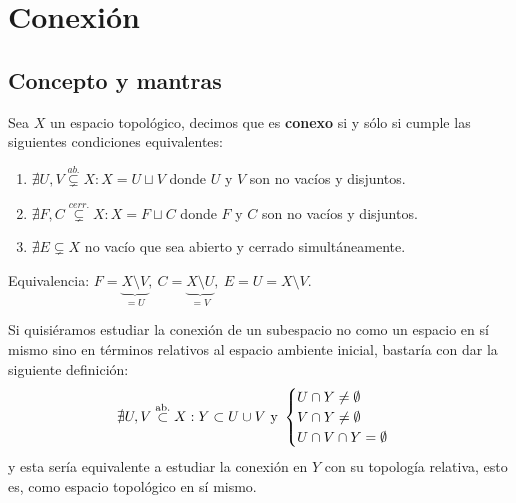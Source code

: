 \chapter{Conexión}%
\label{cha:conexion}
\section{Concepto y mantras}%
\label{sec:concepto_y_mantras_conx}
\begin{defi}[Conexión]
Sea $X$ un espacio topológico, decimos que es \textbf{conexo} si y sólo si cumple las siguientes condiciones equivalentes:
\begin{enumerate}
    \item $\nexists U,V \stackrel{ab.}{\subsetneq} X: X= U \sqcup V$ donde $U$ y $V$ son no vacíos y disjuntos.
    \item $\nexists F,C \stackrel{cerr.}{\subsetneq} X: X= F \sqcup C$ donde $F$ y $C$ son no vacíos y disjuntos.
    \item $\nexists E \subsetneq X$ no vacío que sea abierto y cerrado simultáneamente.
\end{enumerate}
\end{defi}
\begin{demo}
Equivalencia: $F = \underbrace{X \setminus V}_{= U},\ C = \underbrace{X \setminus U}_{= V},\ E = U = X \setminus V.$
\end{demo}

\begin{obs}
Si quisiéramos estudiar la conexión de un subespacio no como un espacio en sí mismo sino en términos relativos al espacio ambiente inicial, bastaría con dar la siguiente definición:
\[
\nexists U,V \stackrel{\text{ab.}}{\subset} X : Y \subset U \cup V \mbox{ y } \begin{cases}
    U \cap Y \neq \emptyset\\
    V \cap Y \neq \emptyset\\
    U \cap V \cap Y = \emptyset
\end{cases} 
\]
y esta sería equivalente a estudiar la conexión en $Y$ con su topología relativa, esto es, como espacio topológico en sí mismo.
\end{obs}

